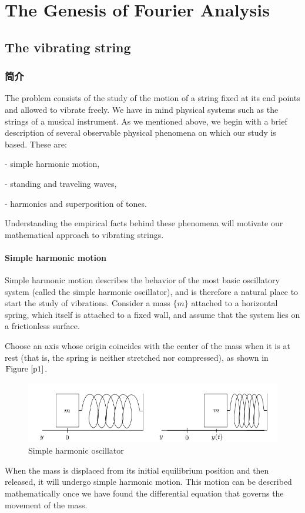 \documentclass[12pt]{book}
\theoremstyle{definition}\newtheorem{dfn}{Définition}[chapter]
\theoremstyle{plain}\newtheorem{thm}{Théorème}[chapter]
\theoremstyle{plain}\newtheorem{prp}{Proposition}[chapter]
\theoremstyle{plain}\newtheorem{lem}{\bf Lemme}[chapter]
\theoremstyle{plain}\newtheorem{axm}{\bf Axiome}[chapter]
\theoremstyle{plain}\newtheorem{lmm}{\bf Lemme}[chapter]
\theoremstyle{plain}\newtheorem{exm}{\bf Example}[chapter]
\theoremstyle{plain}\newtheorem{cor}{\bf Corollaire}[chapter]
\theoremstyle{remark}\newtheorem{rem}{Remarque}[chapter]
\newcommand{\reffig}[1]{\text{Figure}\ \ref{#1}}
\begin{document}
\chapter{The Genesis of Fourier Analysis}
\section{The vibrating string}
\subsection{简介}
The problem consists of the study of the motion of a string fixed at its end points and allowed to vibrate freely. We have in mind physical systems such as the strings of a musical instrument. As we mentioned above, we begin with a brief description of several observable physical phenomena on which our study is based. These are:

- simple harmonic motion,

- standing and traveling waves,

- harmonics and superposition of tones.

Understanding the empirical facts behind these phenomena will motivate our mathematical approach to vibrating strings.
\subsubsection{Simple harmonic motion}
Simple harmonic motion describes the behavior of the most basic oscillatory system (called the simple harmonic oscillator), and is therefore a natural place to start the study of vibrations. Consider a mass $\{m\}$ attached to a horizontal spring, which itself is attached to a fixed wall, and assume that the system lies on a frictionless surface.

Choose an axis whose origin coincides with the center of the mass when it is at rest (that is, the spring is neither stretched nor compressed), as shown in $\reffig{p1}$.
\begin{figure}[H]\centering\includegraphics[width=1\textwidth]{image//The Genesis of Fourier Analysis//1}
\caption{Simple harmonic oscillator}
\label{p1}	
\end{figure}
 When the mass is displaced from its initial equilibrium position and then released, it will undergo simple harmonic motion. This motion can be described mathematically once we have found the differential equation that governs the movement of the mass.
 
\end{document}
